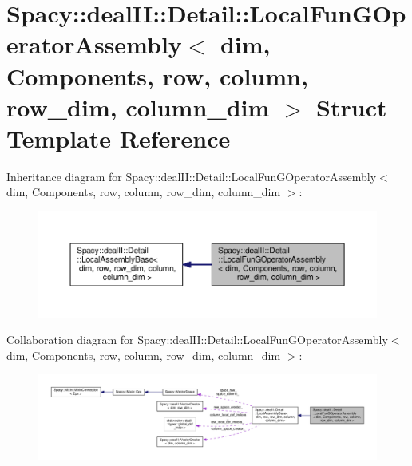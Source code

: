 \hypertarget{structSpacy_1_1dealII_1_1Detail_1_1LocalFunGOperatorAssembly}{\section{Spacy\-:\-:deal\-I\-I\-:\-:Detail\-:\-:Local\-Fun\-G\-Operator\-Assembly$<$ dim, Components, row, column, row\-\_\-dim, column\-\_\-dim $>$ Struct Template Reference}
\label{structSpacy_1_1dealII_1_1Detail_1_1LocalFunGOperatorAssembly}
}


Inheritance diagram for Spacy\-:\-:deal\-I\-I\-:\-:Detail\-:\-:Local\-Fun\-G\-Operator\-Assembly$<$ dim, Components, row, column, row\-\_\-dim, column\-\_\-dim $>$\-:
\nopagebreak
\begin{figure}[H]
\begin{center}
\leavevmode
\includegraphics[width=350pt]{structSpacy_1_1dealII_1_1Detail_1_1LocalFunGOperatorAssembly__inherit__graph}
\end{center}
\end{figure}


Collaboration diagram for Spacy\-:\-:deal\-I\-I\-:\-:Detail\-:\-:Local\-Fun\-G\-Operator\-Assembly$<$ dim, Components, row, column, row\-\_\-dim, column\-\_\-dim $>$\-:
\nopagebreak
\begin{figure}[H]
\begin{center}
\leavevmode
\includegraphics[width=350pt]{structSpacy_1_1dealII_1_1Detail_1_1LocalFunGOperatorAssembly__coll__graph}
\end{center}
\end{figure}
